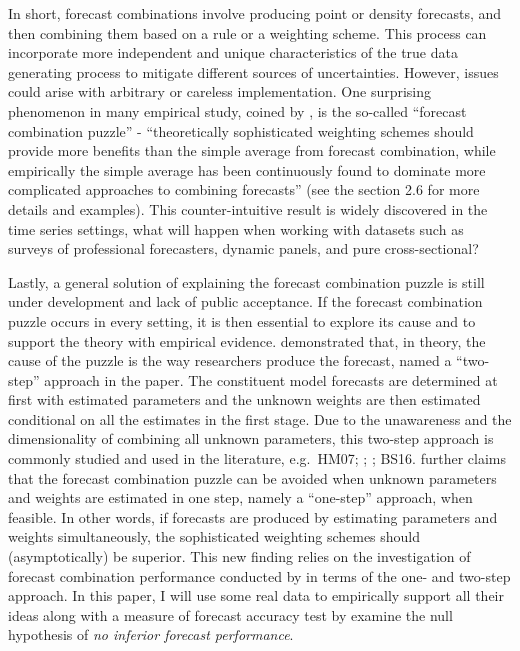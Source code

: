 \documentclass{monashthesis}
\begin{document}
In short, forecast combinations involve producing point or density forecasts, and then combining them based on a rule or a weighting scheme. This process can incorporate more independent and unique characteristics of the true data generating process to mitigate different sources of uncertainties. However, issues could arise with arbitrary or careless implementation. One surprising phenomenon in many empirical study, coined by \textcite{SW04}, is the so-called ``forecast combination puzzle'' - ``theoretically sophisticated weighting schemes should provide more benefits than the simple average from forecast combination, while empirically the simple average has been continuously found to dominate more complicated approaches to combining forecasts'' \autocite{WHLK22} (see the section 2.6 for more details and examples). This counter-intuitive result is widely discovered in the time series settings, what will happen when working with datasets such as surveys of professional forecasters, dynamic panels, and pure cross-sectional?

Lastly, a general solution of explaining the forecast combination puzzle is still under development and lack of public acceptance. If the forecast combination puzzle occurs in every setting, it is then essential to explore its cause and to support the theory with empirical evidence. \textcite{FZMP23} demonstrated that, in theory, the cause of the puzzle is the way researchers produce the forecast, named a ``two-step'' approach in the paper. The constituent model forecasts are determined at first with estimated parameters and the unknown weights are then estimated conditional on all the estimates in the first stage. Due to the unawareness and the dimensionality of combining all unknown parameters, this two-step approach is commonly studied and used in the literature, e.g.~HM07; \textcite{GA11}; \textcite{GR13}; BS16. \textcite{FZMP23} further claims that the forecast combination puzzle can be avoided when unknown parameters and weights are estimated in one step, namely a ``one-step'' approach, when feasible. In other words, if forecasts are produced by estimating parameters and weights simultaneously, the sophisticated weighting schemes should (asymptotically) be superior. This new finding relies on the investigation of forecast combination performance conducted by \textcite{ZMFP22} in terms of the one- and two-step approach. In this paper, I will use some real data to empirically support all their ideas along with a measure of forecast accuracy test by examine the null hypothesis of \emph{no inferior forecast performance}.
\end{document}

